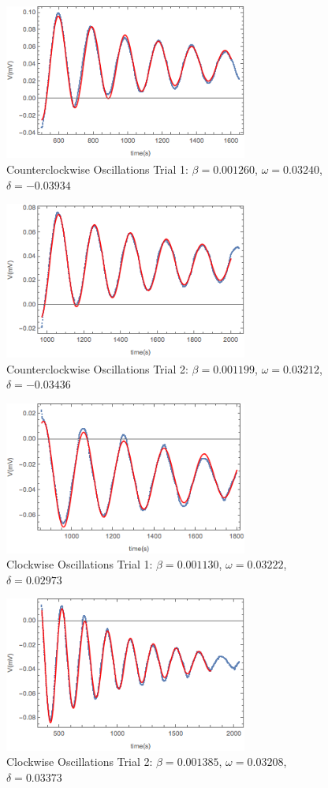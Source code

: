\documentclass[aps, reprint,amsmath,amssymb]{revtex4-1} %
\begin{document}
\begin{figure}[h!]
\centering
\caption{Counterclockwise Oscillations Trial 1: $\beta = 0.001260$, $\omega = 0.03240$, $\delta=-0.03934$}
\includegraphics[width=8cm]{figs/counterclockwise1plot.png}
\end{figure}

\begin{figure}[h!]
\centering
\caption{Counterclockwise Oscillations Trial 2: $\beta = 0.001199$, $\omega = 0.03212$, $\delta=-0.03436$}
\includegraphics[width=8cm]{figs/counterclockwise2plot.png}
\end{figure}

\begin{figure}[h!]
\centering
\caption{Clockwise Oscillations Trial 1: $\beta = 0.001130$, $\omega = 0.03222$, $\delta=0.02973$}
\includegraphics[width=8cm]{figs/clockwise1plot.png}
\end{figure}

\begin{figure}[h!]
\centering
\caption{Clockwise Oscillations Trial 2: $\beta = 0.001385$, $\omega = 0.03208$, $\delta=0.03373$}
\includegraphics[width=8cm]{figs/clockwise2plot.png}
\end{figure}
\end{document}
